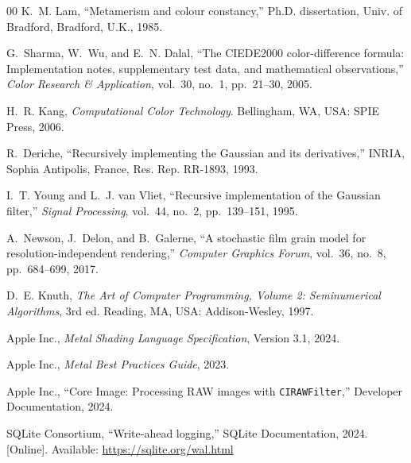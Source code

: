 \begin{thebibliography}{00}
K.~M. Lam, ``Metamerism and colour constancy,'' Ph.D. dissertation, Univ. of
Bradford, Bradford, U.K., 1985.

G.~Sharma, W.~Wu, and E.~N. Dalal, ``The CIEDE2000 color-difference formula:
Implementation notes, supplementary test data, and mathematical observations,''
\emph{Color Research \& Application}, vol.~30, no.~1, pp.~21--30, 2005.

H.~R. Kang, \emph{Computational Color Technology}. Bellingham, WA, USA: SPIE
Press, 2006.

R.~Deriche, ``Recursively implementing the Gaussian and its derivatives,''
INRIA, Sophia Antipolis, France, Res. Rep. RR-1893, 1993.

I.~T. Young and L.~J. van Vliet, ``Recursive implementation of the Gaussian
filter,'' \emph{Signal Processing}, vol.~44, no.~2, pp.~139--151, 1995.

A.~Newson, J.~Delon, and B.~Galerne, ``A stochastic film grain model for
resolution-independent rendering,'' \emph{Computer Graphics Forum}, vol.~36,
no.~8, pp.~684--699, 2017.

D.~E. Knuth, \emph{The Art of Computer Programming, Volume 2: Seminumerical
Algorithms}, 3rd ed. Reading, MA, USA: Addison-Wesley, 1997.

Apple Inc., \emph{Metal Shading Language Specification}, Version 3.1, 2024.

Apple Inc., \emph{Metal Best Practices Guide}, 2023.

Apple Inc., ``Core Image: Processing RAW images with \texttt{CIRAWFilter},''
Developer Documentation, 2024.

SQLite Consortium, ``Write-ahead logging,'' SQLite Documentation, 2024.
[Online]. Available: \url{https://sqlite.org/wal.html}

\end{thebibliography}
